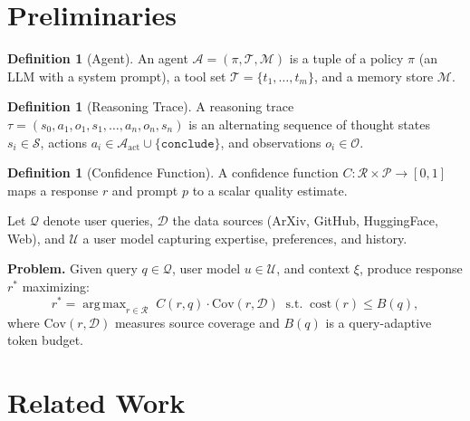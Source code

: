 \documentclass{article}
\theoremstyle{plain}
\theoremstyle{definition}
\newtheorem{definition}[theorem]{Definition}
\DeclareMathOperator*{\argmax}{arg\,max}
\begin{document}
\section{Preliminaries}\label{sec:prelim}

\begin{definition}[Agent]
An agent $\mathcal{A} = (\pi, \mathcal{T}, \mathcal{M})$ is a tuple of a
policy $\pi$ (an LLM with a system prompt), a tool set
$\mathcal{T} = \{t_1, \ldots, t_m\}$, and a memory store $\mathcal{M}$.
\end{definition}

\begin{definition}[Reasoning Trace]
A reasoning trace $\tau = (s_0, a_1, o_1, s_1, \ldots, a_n, o_n, s_n)$ is an
alternating sequence of thought states $s_i \in \mathcal{S}$, actions
$a_i \in \mathcal{A}_{\mathrm{act}} \cup \{\texttt{conclude}\}$, and
observations $o_i \in \mathcal{O}$.
\end{definition}

\begin{definition}[Confidence Function]
A confidence function $C\!: \mathcal{R} \times \mathcal{P} \to [0, 1]$ maps a
response $r$ and prompt $p$ to a scalar quality estimate.
\end{definition}

Let $\mathcal{Q}$ denote user queries, $\mathcal{D}$ the data sources
(ArXiv, GitHub, HuggingFace, Web), and $\mathcal{U}$ a user model capturing
expertise, preferences, and history.

\textbf{Problem.}
Given query $q \in \mathcal{Q}$, user model $u \in \mathcal{U}$, and context
$\xi$, produce response $r^*$ maximizing:
\begin{equation}\label{eq:objective}
  r^* = \argmax_{r \in \mathcal{R}} \; C(r, q) \cdot \mathrm{Cov}(r, \mathcal{D})
  \;\; \text{s.t.} \;\;
  \mathrm{cost}(r) \leq B(q),
\end{equation}
where $\mathrm{Cov}(r, \mathcal{D})$ measures source coverage and $B(q)$ is a
query-adaptive token budget.

\section{Related Work}\label{sec:related}
\end{document}
